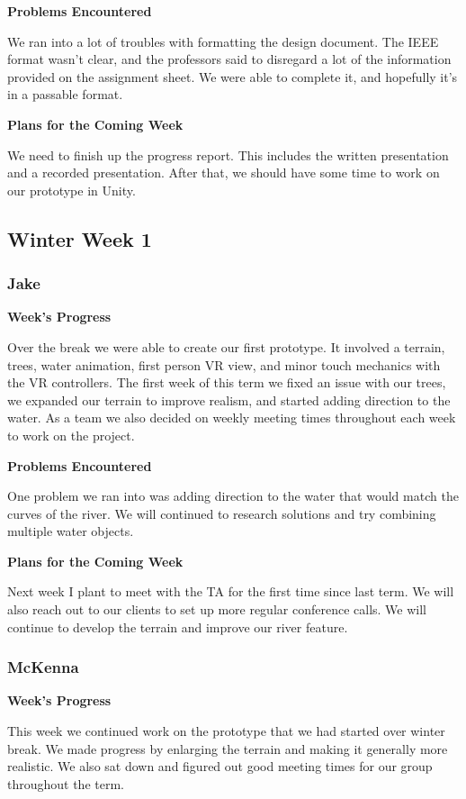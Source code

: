 \documentclass[10pt,journal,compsoc,onecolumn, draftclsnofoot]{IEEEtran}
\begin{document}
\noindent \textbf{Problems Encountered}

We ran into a lot of troubles with formatting the design document. The IEEE format wasn't clear, and the professors said to disregard a lot of the information provided on the assignment sheet. We were able to complete it, and hopefully it's in a passable format.

\noindent \textbf{Plans for the Coming Week}

We need to finish up the progress report. This includes the written presentation and a recorded presentation. After that, we should have some time to work on our prototype in Unity.

\subsection{Winter Week 1}
\subsubsection{Jake}
\noindent \textbf{Week's Progress}

Over the break we were able to create our first prototype. It involved a terrain, trees, water animation, first person VR view, and minor touch mechanics with the VR controllers. The first week of this term we fixed an issue with our trees, we expanded our terrain to improve realism, and started adding direction to the water. As a team we also decided on weekly meeting times throughout each week to work on the project.

\noindent \textbf{Problems Encountered}

One problem we ran into was adding direction to the water that would match the curves of the river. We will continued to research solutions and try combining multiple water objects.

\noindent \textbf{Plans for the Coming Week}

Next week I plant to meet with the TA for the first time since last term. We will also reach out to our clients to set up more regular conference calls. We will continue to develop the terrain and improve our river feature.

\subsubsection{McKenna}
\noindent \textbf{Week's Progress}

This week we continued work on the prototype that we had started over winter break. We made progress by enlarging the terrain and making it generally more realistic. We also sat down and figured out good meeting times for our group throughout the term.
\end{document}
